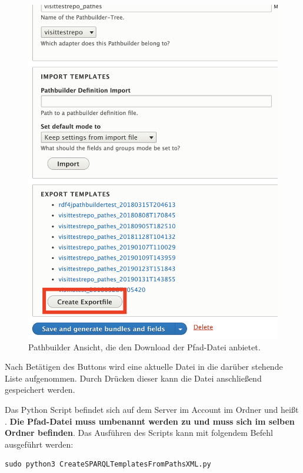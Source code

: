 	\begin{figure}[htb]
    	\centering
	    \includegraphics[width=\textwidth]{Figures/berndl/wisskiPathDownload}
    	\caption{\label{fig:download} \wisski Pathbuilder Ansicht, die den Download der Pfad-Datei anbietet.}
	\end{figure}
	
Nach Betätigen des Buttons wird eine aktuelle Datei in die darüber stehende Liste aufgenommen. Durch Drücken dieser kann die Datei anschließend gespeichert werden.

Das Python Script befindet sich auf dem Server im Account \texttt{} im Ordner \texttt{} und heißt \texttt{}. \textbf{Die Pfad-Datei muss umbenannt werden zu \texttt{} und muss sich im selben Ordner befinden}. Das Ausführen des Scripts kann mit folgendem Befehl ausgeführt werden:

\begin{lstlisting}[style=MyBashStyle, caption={Befehl zum Starten des Python Script zum Erstellen der Query Templates der \visit Metadatenbank.}]
sudo python3 CreateSPARQLTemplatesFromPathsXML.py
\end{lstlisting}

